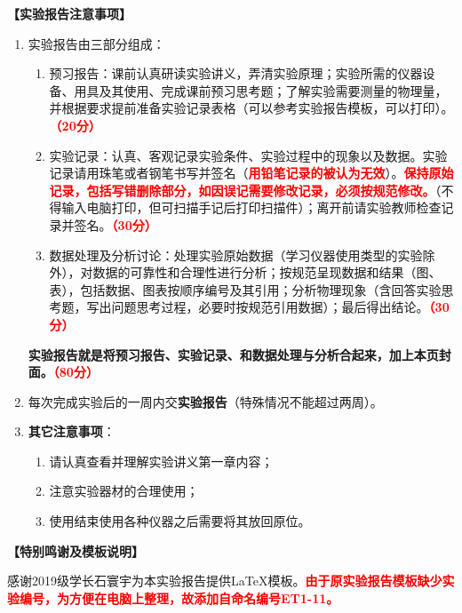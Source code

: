 \documentclass[dvipsnames, svgnames,a4paper,11pt]{article}
\begin{document}
	\textbf{【实验报告注意事项】}
	\begin{enumerate}
		\item 实验报告由三部分组成：
		\begin{enumerate}
			\item 预习报告：课前认真研读实验讲义，弄清实验原理；实验所需的仪器设备、用具及其使用、完成课前预习思考题；了解实验需要测量的物理量，并根据要求提前准备实验记录表格（可以参考实验报告模板，可以打印）。\textcolor{red}{\textbf{（20分）}}
			\item 实验记录：认真、客观记录实验条件、实验过程中的现象以及数据。实验记录请用珠笔或者钢笔书写并签名（\textcolor{red}{\textbf{用铅笔记录的被认为无效}}）。\textcolor{red}{\textbf{保持原始记录，包括写错删除部分，如因误记需要修改记录，必须按规范修改。}}（不得输入电脑打印，但可扫描手记后打印扫描件）；离开前请实验教师检查记录并签名。\textcolor{red}{\textbf{（30分）}}
			\item 数据处理及分析讨论：处理实验原始数据（学习仪器使用类型的实验除外），对数据的可靠性和合理性进行分析；按规范呈现数据和结果（图、表），包括数据、图表按顺序编号及其引用；分析物理现象（含回答实验思考题，写出问题思考过程，必要时按规范引用数据）；最后得出结论。\textcolor{red}{\textbf{（30分）}}
		\end{enumerate}
		\textbf{实验报告就是将预习报告、实验记录、和数据处理与分析合起来，加上本页封面。\textcolor{red}{（80分）}}
		\item 每次完成实验后的一周内交\textbf{实验报告}（特殊情况不能超过两周）。
		\item \textbf{其它注意事项}：
		\begin{enumerate}
			\item 请认真查看并理解实验讲义第一章内容；
			\item 注意实验器材的合理使用；
			\item 使用结束使用各种仪器之后需要将其放回原位。
		\end{enumerate}
	\end{enumerate}
	
	
	
	
	\textbf{【特别鸣谢及模板说明】}	
	
	感谢2019级学长石寰宇为本实验报告提供\LaTeX 模板。\textcolor{red}{\textbf{由于原实验报告模板缺少实验编号，为方便在电脑上整理，故添加自命名编号ET1-11。}}
	
	
	
	\clearpage
	\tableofcontents
	\clearpage
	
\end{document}

